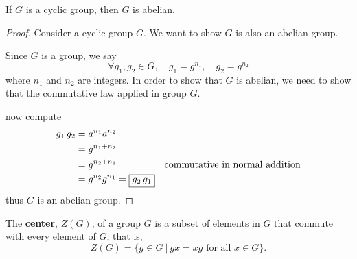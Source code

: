 \begin{lemma}
    If $G$ is a cyclic group, then $G$ is abelian.
\end{lemma}
\begin{proof}
    Consider a cyclic group $G$. We want to show $G$ is also an abelian group.
    
    Since $G$ is a group, we say 
    \[
        \forall g_1, g_2 \in G, \quad g_1 = g^{n_1}, \quad g_2 = g^{n_2}
    \]
    where $n_1$ and $n_2$ are integers. In order to show that $G$ is abelian, we need to show that 
    the commutative law applied in group $G$.

    now compute 
    \begin{align*}
        g_1\,g_2 &= a^{n_1} a^{n_2}\\
        &= g^{n_1 + n_2}\\
        &= g^{n_2 + n_1} & \text{commutative in normal addition}\\
        &= g^{n_2} g^{n_1} = \fbox{$g_2\, g_1$}
    \end{align*}
    thus $G$ is an abelian group.
\end{proof}

\begin{definition}
    The \textbf{center}, $Z(G)$, of a group $G$ is a subset of elements in $G$ that commute with every element of $G$, that is, 
    \begin{equation}
        Z(G) = \{ g \in G \> | \> gx = xg \text{ for all } x \in G \}.
    \end{equation}
\end{definition}


